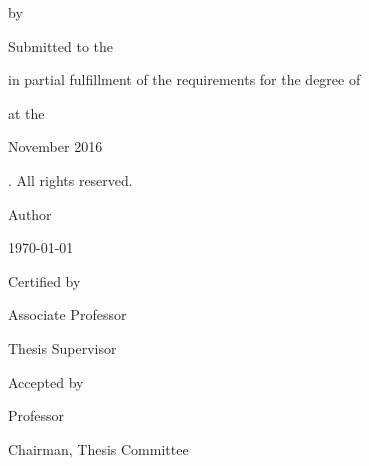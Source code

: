 \documentclass[
  12pt, %
  english, %
  doublespacing, %
]{setting} %
\author{Yee Shian Henry Tong} %
\newcommand\blankpage{
  \null
  \thispagestyle{empty}
  \addtocounter{page}{-1}
  \newpage
}
\begin{document}
\frontmatter %
\pagestyle{plain} %

\iffalse

\afterpage{\blankpage} %



\begin{titlepage}
  \begin{center} 
    {\Large \bfseries \ttitle \par}
    \bigskip
    {\normalsize by \par}
    \bigskip
    {\large \authorname \par}
    \bigskip
    {\normalsize Submitted to the \deptname \par in partial fulfillment of the requirements for the degree of \par}
    \bigskip
    {\large \degreename \par}
    \bigskip    
    {at the \par}
    \bigskip
    {\large \MakeUppercase{\univname} \par}
    \bigskip
    {\normalsize November 2016 \par}
    \bigskip
    {\textcopyright \space \univname {}. All rights reserved. \par}
    \bigskip \bigskip \bigskip 
    \begin{flushleft}
      {\large Author \dotfill \par}
    \end{flushleft}
    \begin{flushright} 
      {\deptname \par \today \par}
    \end{flushright}
    \begin{flushleft}
      {\large Certified by \dotfill \par}
    \end{flushleft}
    \begin{flushright} 
      {\supname \par Associate Professor \par Thesis Supervisor \par}
    \end{flushright}
    \begin{flushleft}
      {\large Accepted by \dotfill \par}
    \end{flushleft}
    \begin{flushright} 
      {\examname \par Professor \par Chairman, Thesis Committee \par}
    \end{flushright}
  \end{center}
\end{titlepage}
\end{document}
